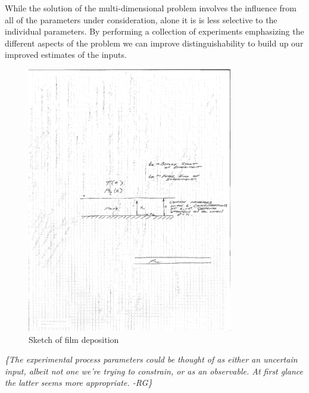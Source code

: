\documentclass[11pt]{article}
\newcommand{\remrg}[1]{ {\it \color{drkgrn} \{#1 -RG\}}}
\begin{document}
While the solution of the multi-dimensional problem involves the
influence from all of the parameters under consideration, alone it is
is less selective to the individual parameters. By performing a
collection of experiments emphasizing the different aspects of the
problem we can improve distinguishability to build up our improved
estimates of the inputs. 

\begin{figure}[h]
  \centering
  \includegraphics[width=0.8\textwidth]{pd_sketch.pdf}
  \caption{Sketch of film deposition}
  \label{fig:film}
\end{figure}


\remrg{The experimental process parameters could be
  thought of as either an uncertain input, albeit not one we're
  trying to constrain, or as an observable. At first glance the latter
  seems more appropriate.}
\end{document}
